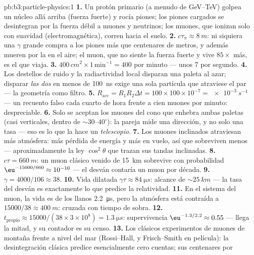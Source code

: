 \begin{solution}{pb:b3:particle-physics:1}
\textbf{1.} Un protón primario (a menudo de \unit{GeV}--\unit{TeV})
golpea un núcleo allá arriba (fuerza fuerte) y rocía piones; los
piones cargados se desintegran por la fuerza débil a muones y neutrinos;
los muones, que ionizan solo con suavidad (electromagnética), corren hacia el
suelo.
\textbf{2.} $c\tau_\pi \approx \qty{8}{m}$: ni siquiera una $\gamma$ grande
compra a los piones más que centenares de metros, y además mueren por
la  en el aire; el muon, que no siente la fuerza fuerte y
vive $85\times$ más, es el que viaja.
\textbf{3.} $400\,\unit{cm^2}\times1\,\text{min}^{-1} = 400$
por minuto --- unos 7 por segundo.
\textbf{4.} Los destellos de ruido y la radiactividad local disparan una
paleta al azar; disparar \emph{las dos} en menos de \qty{100}{ns}
exige una sola partícula que atraviese el par --- la geometría como
filtro.
\textbf{5.} $R_{\text{acc}} = R_1R_2\Delta t = 100\times100
\times10^{-7} = \qty{e-3}{s^{-1}}$ --- un recuento falso cada
cuarto de hora frente a cien muones por minuto: despreciable.
\textbf{6.} Solo se aceptan los muones del cono que enhebra ambas
paletas (casi verticales, dentro de ${\sim}30$--$40^\circ$):
la pareja mide una dirección, y no solo una tasa ---
eso es lo que la hace un \emph{telescopio}.
\textbf{7.} Los muones inclinados atraviesan más atmósfera: más pérdida de
energía y más  en vuelo, así que sobreviven menos ---
aproximadamente la ley $\cos^2\theta$ que trazan sus tandas inclinadas.
\textbf{8.} $c\tau = \qty{660}{m}$: un muon clásico venido de
\qty{15}{km} sobrevive con probabilidad
$\eu^{-15000/660} \approx 10^{-10}$ --- el desván contaría
un muon por década.
\textbf{9.} $\gamma = 4000/106 \approx 38$.
\textbf{10.} Vida dilatada $\gamma\tau \approx
\qty{84}{\micro s}$: alcance de ${\sim}\qty{25}{km}$ --- la tasa del
desván es exactamente lo que predice la relatividad.
\textbf{11.} En el sistema del muon, la vida es de los llanos
\qty{2.2}{\micro s}, pero la atmósfera está contraída a
$15000/38 \approx \qty{400}{m}$: cruzada con tiempo de sobra.
\textbf{12.} $t_{\text{propio}} \approx 15000/(38\times3\times
10^8) = \qty{1.3}{\micro s}$: supervivencia $\eu^{-1.3/2.2} \approx
0.55$ --- llega la mitad, y su contador es su censo.
\textbf{13.} Los clásicos experimentos de muones de montaña frente a nivel
del mar (Rossi--Hall, y Frisch--Smith en película): la desintegración
clásica predice esencialmente cero cuentas; sus centenares por

\end{solution}

